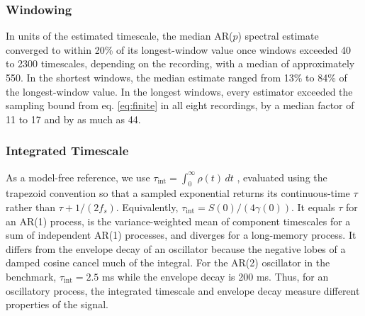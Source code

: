 \documentclass[pdflatex,lineno,sn-nature]{sn-jnl}
\theoremstyle{thmstyleone}
\theoremstyle{thmstyletwo}
\theoremstyle{thmstylethree}
\begin{document}
\subsubsection*{Windowing}

In units of the estimated timescale, the median AR($p$) spectral estimate converged to within 20\% of its longest-window value once windows exceeded 40 to 2300 timescales, depending on the recording, with a median of approximately 550. In the shortest windows, the median estimate ranged from 13\% to 84\% of the longest-window value. In the longest windows, every estimator exceeded the sampling bound from eq. \ref{eq:finite} in all eight recordings, by a median factor of 11 to 17 and by as much as 44.

\subsubsection*{Integrated Timescale}

As a model-free reference, we use $\tau_{\mathrm{int}} = \int_0^\infty \rho(t)\,dt$ \cite{sokal_monte_1997, priestley_spectral_1981}, evaluated using the trapezoid convention so that a sampled exponential returns its continuous-time $\tau$ rather than $\tau + 1/(2f_s)$. Equivalently, $\tau_{\mathrm{int}} = S(0)/(4\gamma(0))$. It equals $\tau$ for an AR(1) process, is the variance-weighted mean of component timescales for a sum of independent AR(1) processes, and diverges for a long-memory process. It differs from the envelope decay of an oscillator because the negative lobes of a damped cosine cancel much of the integral. For the AR(2) oscillator in the benchmark, $\tau_{\mathrm{int}} = 2.5$ ms while the envelope decay is 200 ms. Thus, for an oscillatory process, the integrated timescale and envelope decay measure different properties of the signal.

\clearpage


\end{document}
